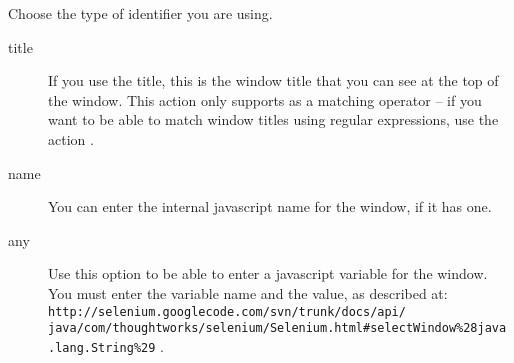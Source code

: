 Choose the type of identifier you are using.
\begin{description}
\item [title]{If you use the title, this is the window title that you can see at the top of the window. This action only supports  as a matching operator -- if you want to be able to match window titles using regular expressions, use the action .}
\item [name]{You can enter the internal javascript name for the window, if it has one.}
\item [any]{Use this option to be able to enter a javascript variable for the window. You must enter the variable name and the value, as described at:\\
 \verb+http://selenium.googlecode.com/svn/trunk/docs/api/+\\
\verb+java/com/thoughtworks/selenium/Selenium.html#selectWindow%28java.lang.String%29+ .}
\end{description}

